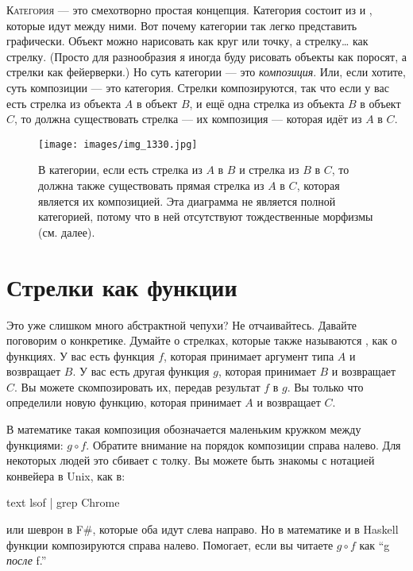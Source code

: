 
\lettrine[lhang=0.17]{К}{атегория} --- это смехотворно простая концепция.
Категория состоит из  и , которые идут между ними. Вот
почему категории так легко представить графически. Объект можно
нарисовать как круг или точку, а стрелку\ldots{} как стрелку. (Просто
для разнообразия я иногда буду рисовать объекты как поросят, а стрелки как
фейерверки.) Но суть категории --- это \emph{композиция}. Или, если хотите,
суть композиции --- это категория. Стрелки композируются, так что
если у вас есть стрелка из объекта $A$ в объект $B$, и ещё одна стрелка из
объекта $B$ в объект $C$, то должна существовать стрелка --- их композиция
--- которая идёт из $A$ в $C$.

\begin{figure}
  \centering
  \texttt{[image: images/img\_1330.jpg]}
  \caption{В категории, если есть стрелка из $A$ в $B$ и стрелка из $B$ в $C$,
    то должна также существовать прямая стрелка из $A$ в $C$, которая является их композицией. Эта диаграмма не является полной
    категорией, потому что в ней отсутствуют тождественные морфизмы (см. далее).}
\end{figure}

\section{Стрелки как функции}

Это уже слишком много абстрактной чепухи? Не отчаивайтесь. Давайте поговорим
о конкретике. Думайте о стрелках, которые также называются , как о
функциях. У вас есть функция $f$, которая принимает аргумент типа $A$ и
возвращает $B$. У вас есть другая функция $g$, которая принимает $B$ и возвращает $C$.
Вы можете скомпозировать их, передав результат $f$ в $g$. Вы только что
определили новую функцию, которая принимает $A$ и возвращает $C$.

В математике такая композиция обозначается маленьким кружком между
функциями: $g \circ f$. Обратите внимание на порядок композиции справа налево. Для некоторых
людей это сбивает с толку. Вы можете быть знакомы с нотацией конвейера в
Unix, как в:

\begin{snip}{text}
lsof | grep Chrome
\end{snip}
или шеврон \code{>>} в F\#, которые оба
идут слева направо. Но в математике и в Haskell функции
композируются справа налево. Помогает, если вы читаете $g \circ f$ как ``g \emph{после} f.''


